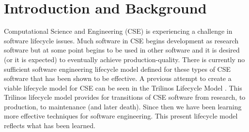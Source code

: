 \documentclass[11pt]{SANDreport}
\begin{document}
%
\SANDmain %




%
\section{Introduction and Background}
%


\begin{figure}
\begin{center}
\end{center}
\end{figure}


Computational Science and Engineering (CSE) is experiencing a
challenge in software lifecycle issues.  Much software in CSE begins
development as research software but at some point begins to be used
in other software and it is desired (or it is expected) to eventually
achieve production-quality.  There is currently no sufficient software
engineering lifecycle model defined for these types of CSE software
that has been shown to be effective.  A previous attempt to create a
viable lifecycle model for CSE can be seen in the Trilinos Lifecycle
Model {}\cite{TrilinosLifecycleModel2007}.  This Trilinos lifecycle
model provides for transitions of CSE software from research, to
production, to maintenance (and later death).  Since then we have
been learning more effective techniques for software engineering.  This
present lifecycle model reflects what has been learned.
\end{document}
